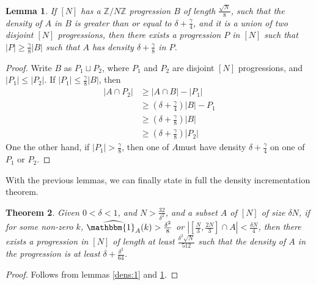 \documentclass[12pt, titlepage]{article}
\newtheorem{thm}{Theorem}[section]
\newtheorem{lem}[thm]{Lemma}
\theoremstyle{definition}
\newcommand{\znz}{\mathbb{Z}/N\mathbb{Z}}
\newcommand{\indi}{\mathbbm{1}}
\begin{document}
\begin{lem} \label{dens:2}
    If $[N]$ has a $\znz$ progression $B$ of length $\frac{\sqrt{N}}{8}$, such that the density of $A$ in $B$ is greater than or equal to $\delta + \frac{\gamma}{4}$, and it is a union of two disjoint $[N]$ progressions, then there exists a progression $P$ in $[N]$ such that $|P| \geq \frac{\gamma}{8} |B|$ such that $A$ has density $\delta + \frac{\gamma}{8}$ in $P$.
\end{lem}

\begin{proof}
    Write $B$ as $P_1 \sqcup P_2$, where $P_1$ and $P_2$ are disjoint $[N]$ progressions, and $|P_1| \leq |P_2|$. If $|P_1| \leq \frac{\gamma}{8} |B|$, then
    \begin{align*}
        |A \cap P_2| &\geq |A \cap B| - |P_1|\\
        &\geq \left( \delta + \frac{\gamma}{4} \right)|B| - P_1 \\
        &\geq \left( \delta + \frac{\gamma}{8} \right)|B| \\
        &\geq \left( \delta + \frac{\gamma}{8} \right)|P_2|
    \end{align*}
    One the other hand, if $|P_1| > \frac{\gamma}{8}$, then one of $A $must have density $\delta + \frac{\gamma}{4}$ on one of $P_1$ or $P_2$.
\end{proof}

With the previous lemmas, we can finally state in full the density incrementation theorem.
\begin{thm}
    Given $0 < \delta < 1$, and $N > \frac{32}{\delta^2}$, and a subset $A$ of $[N]$ of size $\delta N$, if for some non-zero $k$, $\widehat{\indi_A}(k) > \frac{\delta^2}{8}$ or $\left| \left[ \frac{N}{3}, \frac{2N}{3} \right] \cap A \right| < \frac{\delta N}{4}$, then there exists a progression in $[N]$ of length at least $\frac{\delta^2 \sqrt{N}}{512}$ such that the density of $A$ in the progression is at least $\delta + \frac{\delta^2}{64}$.
\end{thm}

\begin{proof}
    Follows from lemmas \ref{dens:1} and \ref{dens:2}.
\end{proof}
\end{document}
